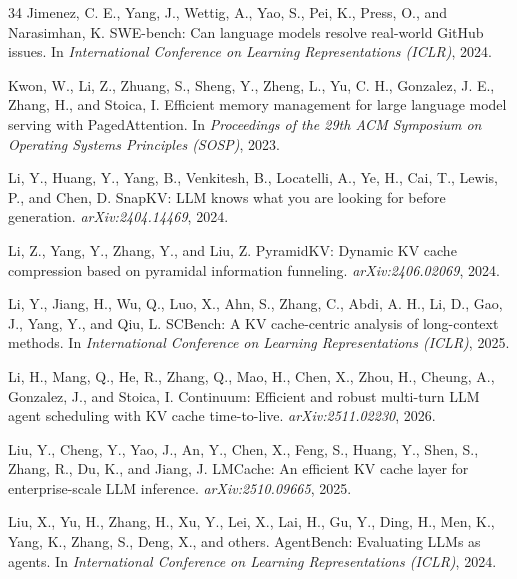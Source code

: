 \documentclass{article}
\begin{document}
\begin{thebibliography}{34}
Jimenez, C. E., Yang, J., Wettig, A., Yao, S., Pei, K., Press, O.,
  and Narasimhan, K.
\newblock SWE-bench: Can language models resolve real-world GitHub
  issues.
\newblock In \emph{International Conference on Learning
  Representations (ICLR)}, 2024.

Kwon, W., Li, Z., Zhuang, S., Sheng, Y., Zheng, L., Yu, C. H.,
  Gonzalez, J. E., Zhang, H., and Stoica, I.
\newblock Efficient memory management for large language model serving
  with PagedAttention.
\newblock In \emph{Proceedings of the 29th ACM Symposium on Operating
  Systems Principles (SOSP)}, 2023.

Li, Y., Huang, Y., Yang, B., Venkitesh, B., Locatelli, A., Ye, H.,
  Cai, T., Lewis, P., and Chen, D.
\newblock SnapKV: LLM knows what you are looking for before generation.
\newblock \emph{arXiv:2404.14469}, 2024.

Li, Z., Yang, Y., Zhang, Y., and Liu, Z.
\newblock PyramidKV: Dynamic KV cache compression based on pyramidal
  information funneling.
\newblock \emph{arXiv:2406.02069}, 2024.

Li, Y., Jiang, H., Wu, Q., Luo, X., Ahn, S., Zhang, C., Abdi, A. H.,
  Li, D., Gao, J., Yang, Y., and Qiu, L.
\newblock SCBench: A KV cache-centric analysis of long-context methods.
\newblock In \emph{International Conference on Learning Representations
  (ICLR)}, 2025.

Li, H., Mang, Q., He, R., Zhang, Q., Mao, H., Chen, X., Zhou, H.,
  Cheung, A., Gonzalez, J., and Stoica, I.
\newblock Continuum: Efficient and robust multi-turn LLM agent
  scheduling with KV cache time-to-live.
\newblock \emph{arXiv:2511.02230}, 2026.

Liu, Y., Cheng, Y., Yao, J., An, Y., Chen, X., Feng, S., Huang, Y.,
  Shen, S., Zhang, R., Du, K., and Jiang, J.
\newblock LMCache: An efficient KV cache layer for enterprise-scale LLM
  inference.
\newblock \emph{arXiv:2510.09665}, 2025.

Liu, X., Yu, H., Zhang, H., Xu, Y., Lei, X., Lai, H., Gu, Y.,
  Ding, H., Men, K., Yang, K., Zhang, S., Deng, X., and others.
\newblock AgentBench: Evaluating LLMs as agents.
\newblock In \emph{International Conference on Learning
  Representations (ICLR)}, 2024.


\end{thebibliography}
\end{document}
